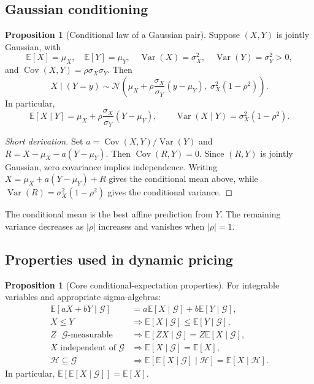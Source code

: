 \documentclass[10pt]{article}
\newcommand{\E}{\mathbb E}
\newcommand{\Var}{\operatorname{Var}}
\newcommand{\Cov}{\operatorname{Cov}}
\newcommand{\1}{\mathbf 1}
\newcommand{\cG}{\mathcal G}
\newcommand{\cH}{\mathcal H}
\theoremstyle{definition}
\newtheorem{proposition}[definition]{Proposition}
\begin{document}
\subsection{Gaussian conditioning}

\begin{proposition}[Conditional law of a Gaussian pair]
Suppose $(X,Y)$ is jointly Gaussian, with
\[
\E[X]=\mu_X,\quad \E[Y]=\mu_Y,\quad
\Var(X)=\sigma_X^2,\quad \Var(Y)=\sigma_Y^2>0,
\]
and $\Cov(X,Y)=\rho\sigma_X\sigma_Y$. Then
\[
X\mid(Y=y)\sim\mathcal N\!\left(
\mu_X+\rho\frac{\sigma_X}{\sigma_Y}(y-\mu_Y),
\;\sigma_X^2(1-\rho^2)
\right).
\]
In particular,
\[
\E[X\mid Y]
=\mu_X+\rho\frac{\sigma_X}{\sigma_Y}(Y-\mu_Y),
\qquad
\Var(X\mid Y)=\sigma_X^2(1-\rho^2).
\]
\end{proposition}

\begin{proof}[Short derivation]
Set
$a=\Cov(X,Y)/\Var(Y)$ and
$R=X-\mu_X-a(Y-\mu_Y)$. Then $\Cov(R,Y)=0$. Since $(R,Y)$ is jointly
Gaussian, zero covariance implies independence. Writing
$X=\mu_X+a(Y-\mu_Y)+R$ gives the conditional mean above, while
$\Var(R)=\sigma_X^2(1-\rho^2)$ gives the conditional variance.
\end{proof}

The conditional mean is the best affine prediction from $Y$. The remaining
variance decreases as $|\rho|$ increases and vanishes when $|\rho|=1$.

\subsection{Properties used in dynamic pricing}

\begin{proposition}[Core conditional-expectation properties]
For integrable variables and appropriate sigma-algebras:
\begin{align*}
\E[aX+bY\mid\cG]&=a\E[X\mid\cG]+b\E[Y\mid\cG],\\
X\le Y&\Longrightarrow \E[X\mid\cG]\le\E[Y\mid\cG],\\
Z\text{ $\cG$-measurable}&\Longrightarrow
\E[ZX\mid\cG]=Z\E[X\mid\cG],\\
X\text{ independent of }\cG&\Longrightarrow
\E[X\mid\cG]=\E[X],\\
\cH\subseteq\cG&\Longrightarrow
\E[\E[X\mid\cG]\mid\cH]=\E[X\mid\cH].
\end{align*}
In particular, $\E[\E[X\mid\cG]]=\E[X]$.
\end{proposition}
\end{document}
